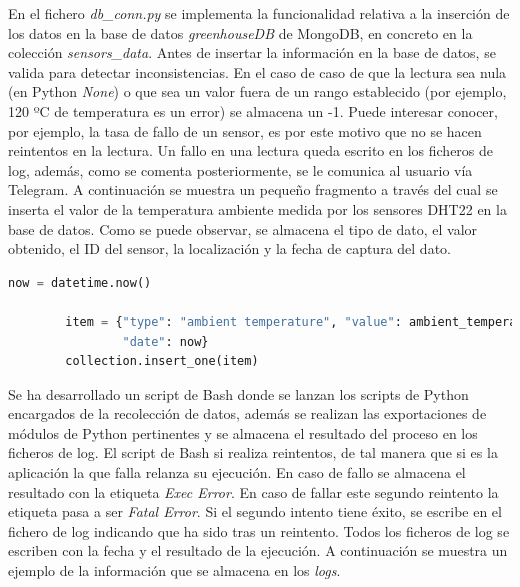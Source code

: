 \documentclass[a4paper, 12pt, oneside]{book}
\begin{document}
En el fichero \textit{db\_conn.py} se implementa la funcionalidad relativa a la inserción de los datos en la base de datos \textit{greenhouseDB} de MongoDB, en concreto en la colección \textit{sensors\_data}. Antes de insertar la información en la base de datos, se valida para detectar inconsistencias. En el caso de caso de que la lectura sea nula (en Python \textit{None}) o que sea un valor fuera de un rango establecido (por ejemplo, 120 ºC de temperatura es un error) se almacena un -1. Puede interesar conocer, por ejemplo, la tasa de fallo de un sensor, es por este motivo que no se hacen reintentos en la lectura. Un fallo en una lectura queda escrito en los ficheros de log, además, como se comenta posteriormente, se le comunica al usuario vía Telegram.
A continuación se muestra un pequeño fragmento a través del cual se inserta el valor de la temperatura ambiente medida por los sensores DHT22 en la base de datos. Como se puede observar, se almacena el tipo de dato, el valor obtenido, el ID del sensor, la localización y la fecha de captura del dato.


\begin{lstlisting}[language=Python]
        now = datetime.now()

        item = {"type": "ambient temperature", "value": ambient_temperature, "sensorID": d.pin, "location": d.location,
                "date": now}
        collection.insert_one(item)
\end{lstlisting}

Se ha desarrollado un script de Bash donde se lanzan los scripts de Python encargados de la recolección de datos, además se realizan las exportaciones de módulos de Python pertinentes y se almacena el resultado del proceso en los ficheros de log. El script de Bash si realiza reintentos, de tal manera que si es la aplicación la que falla relanza su ejecución. En caso de fallo se almacena el resultado con la etiqueta \textit{Exec Error}. En caso de fallar este segundo reintento la etiqueta pasa a ser \textit{Fatal Error}. Si el segundo intento tiene éxito, se escribe en el fichero de log indicando que ha sido tras un reintento. Todos los ficheros de log se escriben con la fecha y el resultado de la ejecución.
A continuación se muestra un ejemplo de la información que se almacena en los \textit{logs}.
\end{document}
